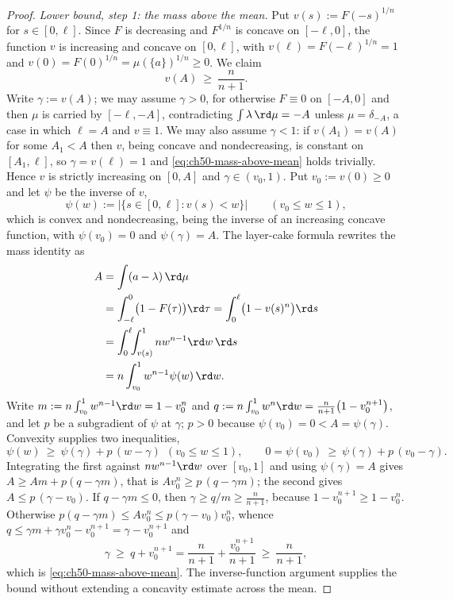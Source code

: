 \begin{proof}
\emph{Lower bound, step 1: the mass above the mean.}  Put
$v(s):=F(-s)^{1/n}$ for $s\in[0,\ell]$.  Since $F$ is decreasing and
$F^{1/n}$ is concave on $[-\ell,0]$, the function $v$ is increasing
and concave on $[0,\ell]$, with $v(\ell)=F(-\ell)^{1/n}=1$ and
$v(0)=F(0)^{1/n}=\mu(\{a\})^{1/n}\ge0$.  We claim
\[
 v(A)\ \ge\ \frac{n}{n+1}.
\tag{50.36}\label{eq:ch50-mass-above-mean}
\]
Write $\gamma:=v(A)$; we may assume $\gamma>0$, for otherwise
$F\equiv0$ on $[-A,0]$ and then $\mu$ is carried by
$[-\ell,-A]$, contradicting $\int\lambda\,\rd\mu=-A$ unless
$\mu=\delta_{-A}$, a case in which $\ell=A$ and
$v\equiv1$.  We may also assume $\gamma<1$: if $v(A_1)=v(A)$ for some $A_1<A$ then
$v$, being concave and nondecreasing, is constant on $[A_1,\ell]$, so
$\gamma=v(\ell)=1$ and \eqref{eq:ch50-mass-above-mean} holds trivially.
Hence $v$ is strictly increasing on $[0,A]$ and $\gamma\in(v_0,1)$.
Put $v_0:=v(0)\ge0$ and let $\psi$ be the inverse of $v$,
\[
 \psi(w):=\bigl|\{s\in[0,\ell]:v(s)<w\}\bigr|
 \qquad(v_0\le w\le1),
\]
which is convex and nondecreasing, being the inverse of an increasing
concave function, with $\psi(v_0)=0$ and $\psi(\gamma)=A$.  The
layer-cake formula rewrites the mass identity as
\[
 \begin{aligned}
 A&=\int(a-\lambda)\,\rd\mu\\
  &=\int_{-\ell}^{0}\bigl(1-F(\tau)\bigr)\rd\tau
   =\int_0^{\ell}\bigl(1-v(s)^n\bigr)\rd s\\
  &=\int_0^{\ell}\!\!\int_{v(s)}^{1}nw^{n-1}\rd w\,\rd s\\
  &=n\int_{v_0}^{1}w^{n-1}\psi(w)\,\rd w .
 \end{aligned}
\]
Write $m:=n\int_{v_0}^1w^{n-1}\rd w=1-v_0^n$ and
$q:=n\int_{v_0}^1w^{n}\rd w=\tfrac n{n+1}\bigl(1-v_0^{n+1}\bigr)$, and let
$p$ be a subgradient of $\psi$ at $\gamma$; $p>0$ because
$\psi(v_0)=0<A=\psi(\gamma)$.  Convexity supplies two inequalities,
\[
 \psi(w)\ \ge\ \psi(\gamma)+p\,(w-\gamma)\ \ (v_0\le w\le1),
 \qquad
 0=\psi(v_0)\ \ge\ \psi(\gamma)+p\,(v_0-\gamma).
\tag{50.37}\label{eq:ch50-concave-upper}
\]
Integrating the first against $nw^{n-1}\rd w$ over $[v_0,1]$ and using
$\psi(\gamma)=A$ gives $A\ge Am+p(q-\gamma m)$, that is
$Av_0^{n}\ge p\,(q-\gamma m)$; the second gives $A\le p\,(\gamma-v_0)$.
If $q-\gamma m\le0$, then $\gamma\ge q/m\ge\frac n{n+1}$, because
$1-v_0^{n+1}\ge1-v_0^{n}$.  Otherwise
$p(q-\gamma m)\le Av_0^{n}\le p(\gamma-v_0)v_0^{n}$, whence
$q\le\gamma m+\gamma v_0^{n}-v_0^{n+1}=\gamma-v_0^{n+1}$ and
\[
 \gamma\ \ge\ q+v_0^{n+1}
 =\frac n{n+1}+\frac{v_0^{n+1}}{n+1}\ \ge\ \frac n{n+1},
\]
which is \eqref{eq:ch50-mass-above-mean}.  The inverse-function argument supplies the bound without extending a
concavity estimate across the mean.


\end{proof}
